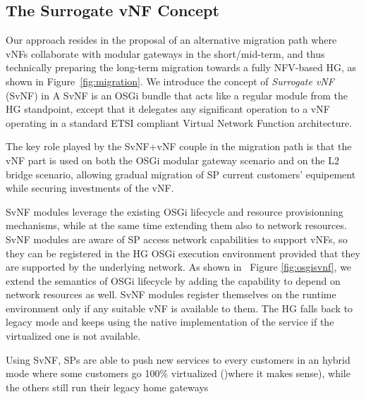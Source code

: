 \subsection{The Surrogate vNF Concept}

Our approach resides in the proposal of an alternative migration path where vNFs collaborate with modular gateways in the short/mid-term, and thus technically preparing the long-term migration towards a fully NFV-based HG, as shown in Figure~\ref{fig:migration}. We introduce the concept of \textit{Surrogate vNF} (SvNF) in  
A SvNF is an OSGi bundle that acts like a regular module from the HG standpoint, except that it delegates any significant operation to a vNF operating in a standard ETSI compliant Virtual Network Function architecture.

The key role played by the SvNF+vNF couple in the migration path is that the vNF part is used on both the OSGi modular gateway scenario and on the L2 bridge scenario, allowing gradual migration of SP current customers' equipement while securing investments of the vNF. 

SvNF modules leverage the existing OSGi lifecycle and resource provisionning mechanisms, while at the same time extending them also to network resources. SvNF modules are aware of SP access network capabilities to support vNFs, so they can be registered in the HG OSGi execution environment provided that they are supported by the underlying network.
As shown in ~Figure \ref{fig:osgisvnf}, we extend the semantics of OSGi lifecycle by adding the capability to depend on network resources as well. SvNF modules register themselves on the runtime environment only if any suitable vNF is available to them. The HG falls back to legacy mode and keeps using the native implementation of the service if the virtualized one is not available.

Using SvNF, SPs are able to push new services to every customers in an hybrid mode where some customers go 100\% virtualized ()where it makes sense), while the others still run their legacy home gateways

 
